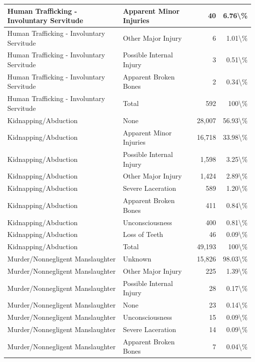 \documentclass[
]{krantz}
\begin{document}
\begin{longtable}[t]{l|l|r|r}
\hline
Human Trafficking - Involuntary Servitude & Apparent Minor Injuries & 40 & 6.76\textbackslash{}\%\\
\hline
Human Trafficking - Involuntary Servitude & Other Major Injury & 6 & 1.01\textbackslash{}\%\\
\hline
Human Trafficking - Involuntary Servitude & Possible Internal Injury & 3 & 0.51\textbackslash{}\%\\
\hline
Human Trafficking - Involuntary Servitude & Apparent Broken Bones & 2 & 0.34\textbackslash{}\%\\
\hline
Human Trafficking - Involuntary Servitude & Total & 592 & 100\textbackslash{}\%\\
\hline
Kidnapping/Abduction & None & 28,007 & 56.93\textbackslash{}\%\\
\hline
Kidnapping/Abduction & Apparent Minor Injuries & 16,718 & 33.98\textbackslash{}\%\\
\hline
Kidnapping/Abduction & Possible Internal Injury & 1,598 & 3.25\textbackslash{}\%\\
\hline
Kidnapping/Abduction & Other Major Injury & 1,424 & 2.89\textbackslash{}\%\\
\hline
Kidnapping/Abduction & Severe Laceration & 589 & 1.20\textbackslash{}\%\\
\hline
Kidnapping/Abduction & Apparent Broken Bones & 411 & 0.84\textbackslash{}\%\\
\hline
Kidnapping/Abduction & Unconsciousness & 400 & 0.81\textbackslash{}\%\\
\hline
Kidnapping/Abduction & Loss of Teeth & 46 & 0.09\textbackslash{}\%\\
\hline
Kidnapping/Abduction & Total & 49,193 & 100\textbackslash{}\%\\
\hline
Murder/Nonnegligent Manslaughter & Unknown & 15,826 & 98.03\textbackslash{}\%\\
\hline
Murder/Nonnegligent Manslaughter & Other Major Injury & 225 & 1.39\textbackslash{}\%\\
\hline
Murder/Nonnegligent Manslaughter & Possible Internal Injury & 28 & 0.17\textbackslash{}\%\\
\hline
Murder/Nonnegligent Manslaughter & None & 23 & 0.14\textbackslash{}\%\\
\hline
Murder/Nonnegligent Manslaughter & Unconsciousness & 15 & 0.09\textbackslash{}\%\\
\hline
Murder/Nonnegligent Manslaughter & Severe Laceration & 14 & 0.09\textbackslash{}\%\\
\hline
Murder/Nonnegligent Manslaughter & Apparent Broken Bones & 7 & 0.04\textbackslash{}\%\\

\end{longtable}
\end{document}
